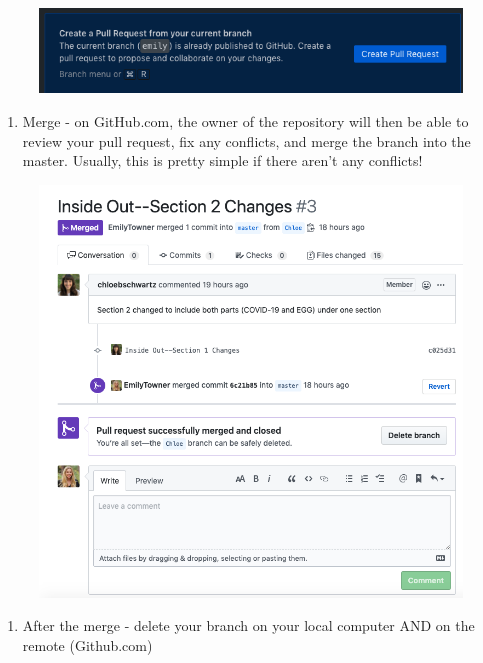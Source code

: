 \documentclass[]{book}
\providecommand{\tightlist}{%
  \setlength{\itemsep}{0pt}\setlength{\parskip}{0pt}}
\begin{document}
\begin{figure}
\centering
\includegraphics{images/research_protocols/github/27.png}
\caption{}
\end{figure}

\begin{enumerate}
\def\labelenumi{\arabic{enumi}.}
\setcounter{enumi}{7}
\tightlist
\item
  Merge - on GitHub.com, the owner of the repository will then be able to review your pull request, fix any conflicts, and merge the branch into the master. Usually, this is pretty simple if there aren't any conflicts!
\end{enumerate}

\begin{figure}
\centering
\includegraphics{images/research_protocols/github/28.png}
\caption{}
\end{figure}

\begin{enumerate}
\def\labelenumi{\arabic{enumi}.}
\setcounter{enumi}{8}
\tightlist
\item
  After the merge - delete your branch on your local computer AND on the remote (Github.com)
\end{enumerate}
\end{document}

